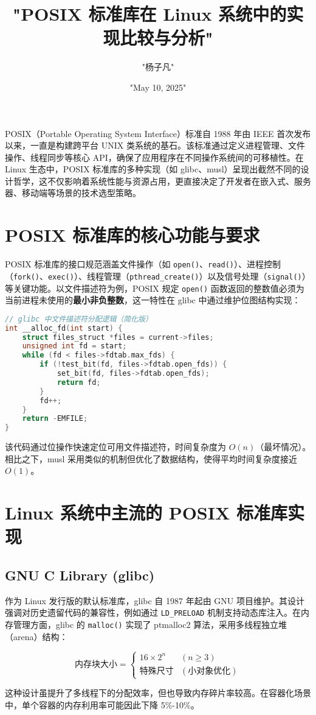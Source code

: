 \title{"POSIX 标准库在 Linux 系统中的实现比较与分析"}
\author{"杨子凡"}
\date{"May 10, 2025"}
\maketitle
POSIX（Portable Operating System Interface）标准自 1988 年由 IEEE 首次发布以来，一直是构建跨平台 UNIX 类系统的基石。该标准通过定义进程管理、文件操作、线程同步等核心 API，确保了应用程序在不同操作系统间的可移植性。在 Linux 生态中，POSIX 标准库的多种实现（如 glibc、musl）呈现出截然不同的设计哲学，这不仅影响着系统性能与资源占用，更直接决定了开发者在嵌入式、服务器、移动端等场景的技术选型策略。\par
\chapter{POSIX 标准库的核心功能与要求}
POSIX 标准库的接口规范涵盖文件操作（如 \verb!open()!、\verb!read()!）、进程控制（\verb!fork()!、\verb!exec()!）、线程管理（\verb!pthread_create()!）以及信号处理（\verb!signal()!）等关键功能。以文件描述符为例，POSIX 规定 \verb!open()! 函数返回的整数值必须为当前进程未使用的\textbf{最小非负整数}，这一特性在 glibc 中通过维护位图结构实现：\par
\begin{lstlisting}[language=c]
// glibc 中文件描述符分配逻辑（简化版）
int __alloc_fd(int start) {
    struct files_struct *files = current->files;
    unsigned int fd = start;
    while (fd < files->fdtab.max_fds) {
        if (!test_bit(fd, files->fdtab.open_fds)) {
            set_bit(fd, files->fdtab.open_fds);
            return fd;
        }
        fd++;
    }
    return -EMFILE;
}
\end{lstlisting}
该代码通过位操作快速定位可用文件描述符，时间复杂度为 $O(n)$（最坏情况）。相比之下，musl 采用类似的机制但优化了数据结构，使得平均时间复杂度接近 $O(1)$。\par
\chapter{Linux 系统中主流的 POSIX 标准库实现}
\section{GNU C Library (glibc)}
作为 Linux 发行版的默认标准库，glibc 自 1987 年起由 GNU 项目维护。其设计强调对历史遗留代码的兼容性，例如通过 \verb!LD_PRELOAD! 机制支持动态库注入。在内存管理方面，glibc 的 \verb!malloc()! 实现了 ptmalloc2 算法，采用多线程独立堆（arena）结构：\par
$$ \text{内存块大小} = \begin{cases} 16 \times 2^n & (n \geq 3) \\ \text{特殊尺寸} & (\text{小对象优化}) \end{cases} $$\par
这种设计虽提升了多线程下的分配效率，但也导致内存碎片率较高。在容器化场景中，单个容器的内存利用率可能因此下降 5\%{}-10\%{}。\par
